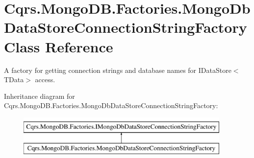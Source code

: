 \hypertarget{classCqrs_1_1MongoDB_1_1Factories_1_1MongoDbDataStoreConnectionStringFactory}{}\section{Cqrs.\+Mongo\+D\+B.\+Factories.\+Mongo\+Db\+Data\+Store\+Connection\+String\+Factory Class Reference}
\label{classCqrs_1_1MongoDB_1_1Factories_1_1MongoDbDataStoreConnectionStringFactory}


A factory for getting connection strings and database names for I\+Data\+Store$<$\+T\+Data$>$ access.  


Inheritance diagram for Cqrs.\+Mongo\+D\+B.\+Factories.\+Mongo\+Db\+Data\+Store\+Connection\+String\+Factory\+:\begin{figure}[H]
\begin{center}
\leavevmode
\includegraphics[height=2.000000cm]{classCqrs_1_1MongoDB_1_1Factories_1_1MongoDbDataStoreConnectionStringFactory}
\end{center}
\end{figure}
